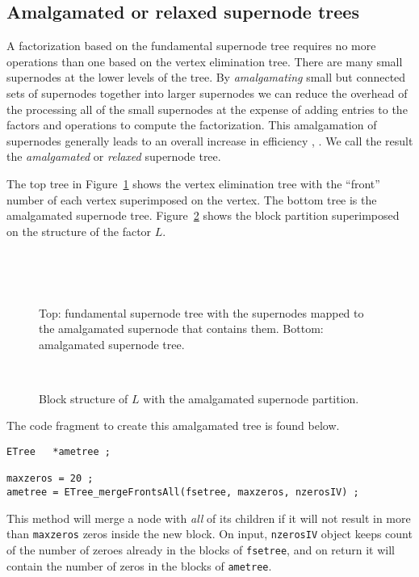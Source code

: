 \subsection{Amalgamated or relaxed supernode trees}
\label{subsection:am-tree}
\par
A factorization based on the fundamental supernode tree requires
no more operations than one based on the vertex elimination tree.
There are many small supernodes at the lower levels of the tree. 
By {\it amalgamating} small but connected sets of supernodes together 
into larger supernodes we can reduce the overhead of the processing 
all of the small supernodes at the expense of adding
entries to the factors and operations to compute the factorization.
This amalgamation of supernodes generally leads to an overall 
increase in efficiency
\cite{ash89-relaxed},
\cite{duf83-multifrontal}.
We call the result the {\it amalgamated} 
or {\it relaxed} supernode tree.
\par
The top tree in Figure~\ref{fig:am-trees}
shows the vertex elimination tree with the ``front'' number of each
vertex superimposed on the vertex.
The bottom tree is the amalgamated supernode tree.
Figure~\ref{fig:R2D100-am-mtx} shows the block partition superimposed on
the structure of the factor $L$.
\par
\begin{figure}[htbp]
\caption{Top: fundamental supernode tree with the supernodes mapped to
the amalgamated supernode that contains them. 
Bottom: amalgamated supernode tree.}
\label{fig:am-trees}
\begin{center}
\mbox{
}
\par
\mbox{
}
\end{center}
\end{figure}
\par
\begin{figure}[htbp]
\caption{Block structure of $L$ with the amalgamated supernode
partition.}
\label{fig:R2D100-am-mtx}
\begin{center}
\mbox{
}
\end{center}
\end{figure}
\par
The code fragment to create this amalgamated tree is found below.
\begin{verbatim}
ETree   *ametree ;

maxzeros = 20 ;
ametree = ETree_mergeFrontsAll(fsetree, maxzeros, nzerosIV) ;
\end{verbatim}
This method will merge a node with {\it all} of its children if it will
not result in more than {\tt maxzeros} zeros inside the new block.
On input, {\tt nzerosIV} object keeps count of the number of zeroes 
already in the blocks of {\tt fsetree}, and on return it will
contain the number of zeros in the blocks of {\tt ametree}.
\par
